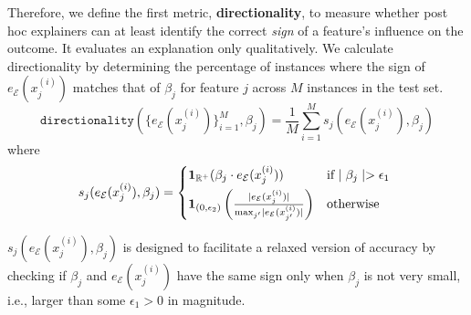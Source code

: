 \documentclass[mnsc,blindrev]{informs3}
\newcommand{\mE}{\mathcal{E}}
\begin{document}
    Therefore, we define the first metric, \textbf{directionality}, to measure whether post hoc explainers can at least identify the correct \textit{sign} of a feature's influence on the outcome. It evaluates an explanation only qualitatively. We calculate directionality by determining the percentage of instances where the sign of $e_\mE(x^{(i)}_j)$ matches that of $\beta_j$ for feature $j$ across $M$ instances in the test set. %
    \begin{equation}
        \label{eq:acc}
        \texttt{directionality}(\{e_\mE(x^{(i)}_j)\}_{i=1}^M,\beta_j) = \frac{1}{M} \sum_{i=1}^M s_j( e_\mE(x^{(i)}_j),\beta_j)
    \end{equation}
    where 
    \begin{equation*}
        s_j(e_\mE(x^{(i)}_j),\beta_j) = \begin{cases*}
                    \mathbf{1}_{\mathbb{R}^+}(\beta_j \cdot e_\mE(x^{(i)}_j)) & if  $\mid \beta_j\mid > \epsilon_1$  \\
                     \mathbf{1}_{(0,\epsilon_2)}\left(\frac{\mid e_\mE(x^{(i)}_j)\mid }{\max_{j'} \mid e_\mE(x^{(i)}_{j'})\mid}\right) & otherwise
                 \end{cases*}
    \end{equation*}

    $s_j(e_\mE(x^{(i)}_j),\beta_j)$ is designed to facilitate a relaxed version of accuracy by checking if $\beta_j$ and $e_\mE(x^{(i)}_j)$ have the same sign only when $\beta_j$ is not very small, i.e., larger than some $\epsilon_1> 0$ in magnitude. %
    
\end{document}
